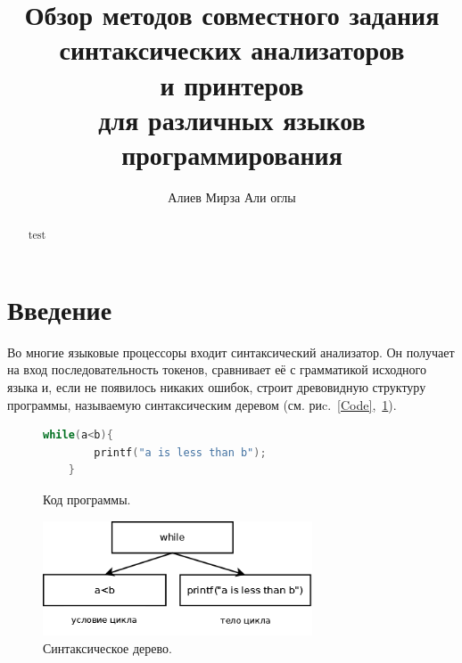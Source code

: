\lstset{language=Haskell}

\title{Обзор методов совместного задания\\
синтаксических анализаторов\\ 
и принтеров\\
для различных языков\\
программирования}


\author{Алиев Мирза Али оглы}



\maketitle             

\begin{abstract}
test
\end{abstract}

\section*{Введение}

Во многие языковые процессоры входит синтаксический анализатор. Он получает на вход 
последовательность токенов, сравнивает её с грамматикой исходного языка и, если не 
появилось никаких ошибок, строит древовидную структуру программы, называемую 
синтаксическим деревом (см. риc.~\ref{Code},~\ref{Tree}).

\begin{figure}[h]
  \begin{minipage}[h]{\textwidth}
    \centering
    \begin{lstlisting}[language=C]
    while(a<b){
        printf("a is less than b");
    }
    \end{lstlisting}
    \caption{Код программы.}
    \label{Code}
  \end{minipage}
  \vskip 3mm
  \begin{minipage}[h]{\textwidth}
    \centering
    \includegraphics[width=8cm]{Aliev/whileTree.png}
    \caption{Синтаксическое дерево.}
    \label{Tree}
  \end{minipage}
\end{figure}

